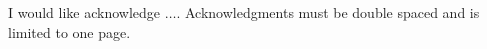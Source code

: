 
\begin{center}\noindent
\begin{minipage}{5.625in}
\hspace{5ex} I would like acknowledge $\dots$. Acknowledgments must be double spaced and is limited to one page. %


\end{minipage}
\end{center}
